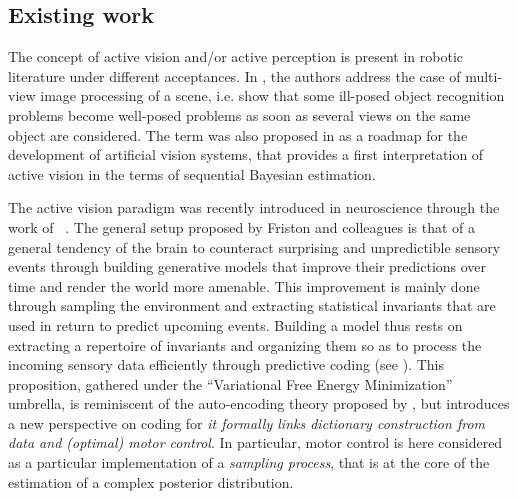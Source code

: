 \documentclass{article} %
\begin{document}
	\subsection{Existing work}	
	
	The concept of active vision and/or active perception is present in robotic literature under different acceptances. In \cite{aloimonos1988active}, the authors address the case of multi-view image processing of a scene, i.e. show that some ill-posed object recognition problems become well-posed problems as soon as several views on the  same object are considered. The term was also proposed in \cite{bajcsy1988active} as a roadmap for the development of artificial vision systems, that provides a first interpretation of active vision in the terms of sequential Bayesian estimation.
	
The active vision paradigm was recently introduced in neuroscience through the work of ~\cite{friston2010free,friston2012perceptions}. %
The general setup proposed by Friston and colleagues is that of a general tendency of the brain to counteract surprising and unpredictible sensory events through building generative models that improve their predictions over time and render the world more amenable. This improvement is mainly done through sampling the environment and extracting statistical invariants that are used in return to predict upcoming events.
Building a model thus rests on extracting a repertoire of invariants and organizing them so as to process the incoming sensory data efficiently through predictive coding (see \cite{rao1999predictive}). This proposition, gathered under the ``Variational Free Energy Minimization'' umbrella, is reminiscent of the auto-encoding theory proposed by \cite{hinton1994autoencoders}, but introduces a new perspective on coding
for \emph{it formally links dictionary construction from data and (optimal) motor control}.
In particular, motor control is here considered as a particular implementation of a \emph{sampling process}, that is at the core of the estimation of a complex posterior distribution. 
\end{document}
